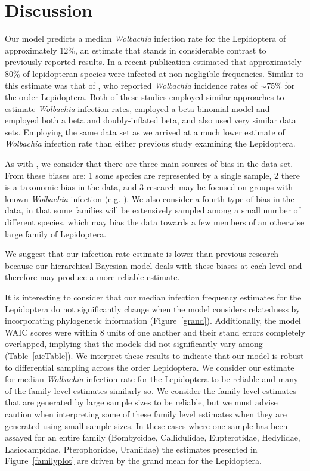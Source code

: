 \documentclass{frontiersSCNS}
\begin{document}
\section{Discussion}
Our model predicts a median \emph{Wolbachia} infection rate for the Lepidoptera of approximately 12\%, an estimate that stands in considerable contrast to previously reported results. In a recent publication \citet{Ahmed:2015aa} estimated that approximately 80\% of lepidopteran species were infected at non-negligible frequencies. Similar to this estimate was that of \citet{Weinert:2015aa}, who reported \emph{Wolbachia} incidence rates of $\sim$75\% for the order Lepidoptera. Both of these studies employed similar approaches to estimate \emph{Wolbachia} infection rates, \citet{Ahmed:2015aa} employed a beta-binomial model  and \citet{Weinert:2015aa} employed both a beta and doubly-inflated beta, and also used very similar data sets. Employing the same data set as \citet{Weinert:2015aa} we arrived at a much lower estimate of \emph{Wolbachia} infection rate than either previous study examining the Lepidoptera. 

As with \citet{Weinert:2015aa}, we consider that there are three main sources of bias in the data set. From \citet{Weinert:2015aa} these biases are: 1\) some species are represented by a single sample, 2\) there is a taxonomic bias in the data, and 3\) research may be focused on groups with known \emph{Wolbachia} infection (e.g. \citet{Nice:2009p7399}). We also consider a fourth type of bias in the data, in that some families will be extensively sampled among a small number of different species, which may bias the data towards a few members of an otherwise large family of Lepidoptera.

We suggest that our infection rate estimate is lower than previous research because our hierarchical Bayesian model deals with these biases at each level and therefore may produce a more reliable estimate.

It is interesting to consider that our median infection frequency estimates for the Lepidoptera do not significantly change when the model considers relatedness by incorporating phylogenetic information (Figure~\ref{grand}). Additionally, the model WAIC scores were within 8 units of one another and their stand errors completely overlapped, implying that the models did not significantly vary among (Table~\ref{aicTable}). We interpret these results to indicate that our model is robust to differential sampling across the order Lepidoptera. We consider our estimate for median \emph{Wolbachia} infection rate for the Lepidoptera to be reliable and many of the family level estimates similarly so. We consider the family level estimates that are generated by large sample sizes to be reliable, but we must advise caution when interpreting some of these family level estimates when they are generated using small sample sizes. In these cases where one sample has been assayed for an entire family (Bombycidae, Callidulidae, Eupterotidae, Hedylidae, Lasiocampidae, Pterophoridae, Uraniidae) the estimates presented in Figure~\ref{familyplot} are driven by the grand mean for the Lepidoptera.
\end{document}
